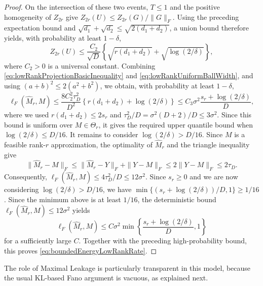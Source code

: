 \documentclass[11pt]{article}
\theoremstyle{definition}
\theoremstyle{remark}
\newcommand{\1}{\boldsymbol{1}}
\begin{document}
\begin{proof}
On the intersection of these two events, \(T\le1\) and the positive
homogeneity of \(Z_{2r}\) give
\(Z_{2r}(U)\le Z_{2r}(G)/\|G\|_F\). Using the preceding expectation
bound and \(\sqrt{d_1}+\sqrt{d_2}\le\sqrt{2(d_1+d_2)}\), a union bound
therefore yields, with probability at least \(1-\delta\),
\begin{equation}
Z_{2r}(U)
\le
\frac{C_2}{\sqrt D}
\left\{
\sqrt{r(d_1+d_2)}
+
\sqrt{\log(2/\delta)}
\right\},
\label{eq:lowRankUniformBallWidth}
\end{equation}
where \(C_2>0\) is a universal constant. Combining
\eqref{eq:lowRankProjectionBasicInequality} and
\eqref{eq:lowRankUniformBallWidth}, and using
\((a+b)^2\le2(a^2+b^2)\), we obtain, with probability at least
\(1-\delta\),
\[
\ell_F(\widehat M_r,M)
\le
\frac{8C_2^2\tau_D^2}{D^2}
\left\{
r(d_1+d_2)+\log(2/\delta)
\right\}
\le
C_3\sigma^2
\frac{s_r+\log(2/\delta)}{D},
\]
where we used \(r(d_1+d_2)\le2s_r\) and
\(\tau_D^2/D=\sigma^2(D+2)/D\le3\sigma^2\). Since this bound is uniform
over \(M\in\Theta_r\), it gives the required upper quantile bound when
\(\log(2/\delta)\le D/16\). It remains to consider \(\log(2/\delta)>D/16\). Since \(M\) is a
feasible rank-\(r\) approximation, the optimality of \(\widehat M_r\)
and the triangle inequality give
\[
\|\widehat M_r-M\|_F
\le
\|\widehat M_r-Y\|_F+\|Y-M\|_F
\le
2\|Y-M\|_F
\le
2\tau_D.
\]
Consequently, \(\ell_F(\widehat M_r,M)\le4\tau_D^2/D\le12\sigma^2\).
Since \(s_r \geq 0\) and we are now considering
\(\log(2/\delta)>D/16\), we have
\(\min\{(s_r+\log(2/\delta))/D,1\}\ge1/16\).
Since the minimum above is at least \(1/16\), the deterministic bound
\(\ell_F(\widehat M_r,M)\le12\sigma^2\) yields
\[
\ell_F(\widehat M_r,M)
\le
C\sigma^2
\min\left\{
\frac{s_r+\log(2/\delta)}{D},1
\right\}
\]
for a sufficiently large \(C\).
Together with the preceding high-probability bound, this proves
\eqref{eq:boundedEnergyLowRankRate}.
\end{proof}
The role of Maximal Leakage is particularly transparent in this model,
because the usual KL-based Fano argument is vacuous, as explained next.
\end{document}

